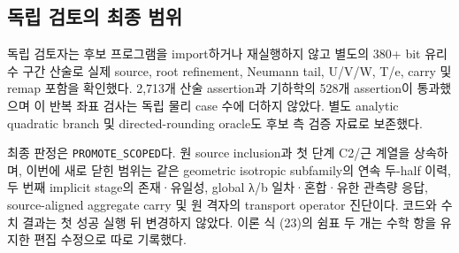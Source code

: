\subsection{독립 검토의 최종 범위}
독립 검토자는 후보 프로그램을 import하거나 재실행하지 않고 별도의 380+ bit 유리수 구간 산술로 실제 source, root refinement, Neumann tail, U/V/W, T/e, carry 및 remap 포함을 확인했다. 2,713개 산술 assertion과 기하학의 528개 assertion이 통과했으며 이 반복 좌표 검사는 독립 물리 case 수에 더하지 않았다. 별도 analytic quadratic branch 및 directed-rounding oracle도 후보 측 검증 자료로 보존했다.

최종 판정은 \texttt{PROMOTE\_SCOPED}다. 원 source inclusion과 첫 단계 C2/근 계열을 상속하며, 이번에 새로 닫힌 범위는 같은 geometric isotropic subfamily의 연속 두-half 이력, 두 번째 implicit stage의 존재·유일성, global λ/b 일차·혼합·유한 관측량 응답, source-aligned aggregate carry 및 원 격자의 transport operator 진단이다. 코드와 수치 결과는 첫 성공 실행 뒤 변경하지 않았다. 이론 식 (23)의 쉼표 두 개는 수학 항을 유지한 편집 수정으로 따로 기록했다.\cite{review}

